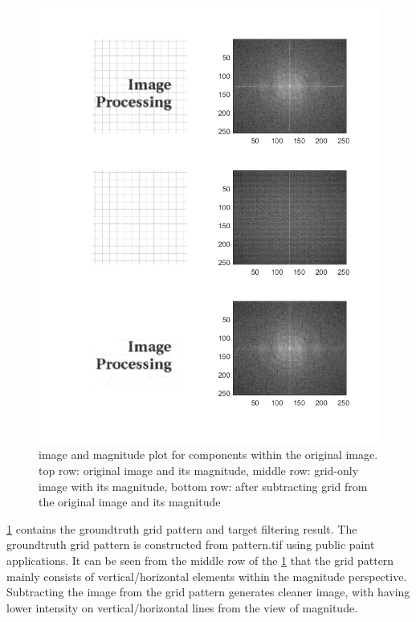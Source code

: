 \documentclass[extendedabs]{bmvc2k}
\begin{document}
\begin{figure}[h]
    \centering
    \includegraphics[width=\linewidth]{hw3_4_2}
    \caption{image and magnitude plot for components within the original image. top row: original image
    and its magnitude, middle row: grid-only image with its magnitude, bottom row: after
    subtracting grid from the original image and its magnitude}
    \label{fig:6}
\end{figure}

\figurename{\ref{fig:6}} contains the groundtruth grid pattern and target filtering result.
The groundtruth grid pattern is constructed from pattern.tif using public paint applications.
It can be seen from the middle row of the \figurename{\ref{fig:6}} that the grid pattern mainly consists
of vertical/horizontal elements within the magnitude perspective. Subtracting the image from the
grid pattern generates cleaner image, with having lower intensity on vertical/horizontal lines from
the view of magnitude.
\end{document}
